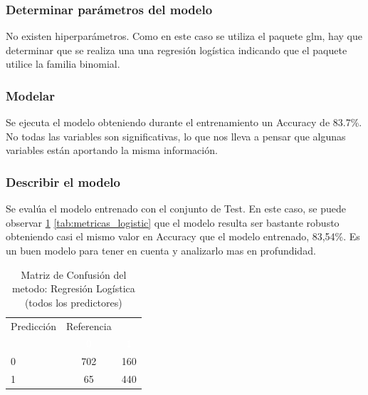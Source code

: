 \subsubsection{Determinar parámetros del modelo}
No existen hiperparámetros. Como en este caso se utiliza el paquete glm,
hay que determinar que se realiza una una regresión logística indicando
que el paquete utilice la familia binomial.


\subsubsection{Modelar}

Se ejecuta el modelo obteniendo durante el entrenamiento un Accuracy de 83.7\%.\\

No todas las variables son significativas, lo que
nos lleva a pensar que algunas variables están aportando la misma información.



\subsubsection{Describir el modelo}


Se evalúa el modelo entrenado con el conjunto de Test. En este caso, se
puede observar \ref{tab:MatrizConf_logistic} \ref{tab:metricas_logistic} que el modelo resulta ser bastante robusto obteniendo
casi el mismo valor en Accuracy que el modelo entrenado, 83,54\%. Es un
buen modelo para tener en cuenta y analizarlo mas en profundidad.

\begin{table}[!h]
	
	\caption{\label{tab:MatrizConf_logistic}Matriz de Confusión del metodo: Regresión Logística (todos los predictores) }
	\centering
	\begin{tabular}[t]{lcc}
		\toprule
		\multicolumn{1}{c}{Predicción} & \multicolumn{1}{c}{Referencia} & \multicolumn{1}{c}{ } \\
		\cmidrule(l{3pt}r{3pt}){1-1} \cmidrule(l{3pt}r{3pt}){2-2}
		\rowcolor{black}  \multicolumn{1}{c}{\textcolor{white}{\textbf{ }}} & \multicolumn{1}{c}{\textcolor{white}{\textbf{0}}} & \multicolumn{1}{c}{\textcolor{white}{\textbf{1}}}\\
		\midrule
		\rowcolor{gray!6}  0 & 702 & 160\\
		1 & 65 & 440\\
		\bottomrule
	\end{tabular}
\end{table}

